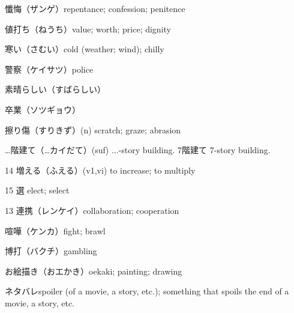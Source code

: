 懺悔（ザンゲ）repentance; confession; penitence

値打ち（ねうち）value; worth; price; dignity

寒い（さむい）cold (weather; wind); chilly

警察（ケイサツ）police

素晴らしい（すばらしい）

卒業（ソツギョウ）

擦り傷（すりきず）(n) scratch; graze; abrasion

…階建て（…カイだて）(suf) ...-story building.
7階建て 7-story building.

14 増える（ふえる）(v1,vi) to increase; to multiply

15 選 elect; select

13 連携（レンケイ）collaboration; cooperation

喧嘩（ケンカ）fight; brawl

博打（バクチ）gambling

お絵描き（おエかき）oekaki; painting; drawing

ネタバレspoiler (of a movie, a story, etc.); something that spoils the end of a movie, a story, etc.

